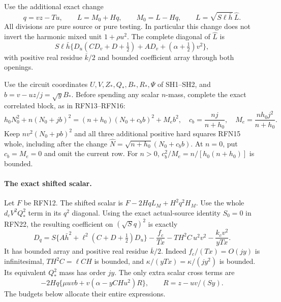 Use the additional exact change
\[
 q=vz-Tu,\qquad L=M_0+Hq,\qquad
 M_0=L-Hq,\qquad L=\sqrt{S\ell\bar h}\,\widehat L .
                                                               \tag{RL11}
\]
All divisions are pure source or pure testing.  In particular
this change does not invert the harmonic mixed unit
\(1+\rho u^2\).
The complete diagonal of \(\widehat L\) is
\[
 S\ell\bar h\{D_u(CD_v+D+\tfrac12)+AD_v+
                   (\alpha+\tfrac12)v^2\},
                                                               \tag{RL12}
\]
with positive real residue \(\overline k/2\) and bounded
coefficient array through both openings.

Use the circuit coordinates \(U,V,Z_*,Q_*,B_*,R_*,\Psi\)
of SH1--SH2, and \(b=v-uz/j=\sqrt y B_*\).
Before spending any scalar \(n\)-mass, complete the exact correlated
block, as in RFN13--RFN16:
\[
 h_0N_0^2+n(N_0+jb)^2
 =(n+h_0)(N_0+c_bb)^2+M_e b^2,\quad
 c_b=\frac{nj}{n+h_0},\quad M_e=\frac{nh_0j^2}{n+h_0}.  \tag{RL13}
\]
Keep \(nv^2(N_0+pb)^2\) and all three additional positive hard
squares RFN15 whole, including after the change
\(\widehat N=\sqrt{n+h_0}(N_0+c_bb)\).
At \(n=0\), put \(c_b=M_e=0\) and omit the current row.
For \(n>0\), \(c_b^2/M_e=n/[h_0(n+h_0)]\) is bounded.

\paragraph{The exact shifted scalar.}
Let \(F\) be RFN12.  The shifted scalar is
\(F-2HqL_M+H^2q^2H_M\).
Use the whole \(d_cV^2Q_*^2\) term in its \(q^2\) diagonal.
Using the exact actual-source identity \(S_0=0\) in RFN22,
the resulting coefficient on \((\sqrt S q)^2\) is exactly
\[
 D_q=S\{A\bar h^2+\ell^2(C+D+\tfrac12)D_u\}
       -\frac{f_c}{Tx}-TH^2C\,u^2v^2
       -\frac{k_cv^2}{yTx}.                            \tag{RL14}
\]
It has bounded array and positive real residue \(\overline k/2\).
Indeed \(f_c/(Tx)=O(jy)\) is infinitesimal, \(TH^2C=\ell CH\)
is bounded, and \(\kappa/(yTx)=\kappa/(jy^2)\) is bounded.
Its equivalent \(Q_*^2\) mass has order \(jy\).
The only extra scalar cross terms are
\[
 -2Hq\{\mu uvb+v(\alpha-yCHu^2)R\},\qquad
 R=z-uv/(Sy).                                        \tag{RL15}
\]
The budgets below allocate their entire expressions.

